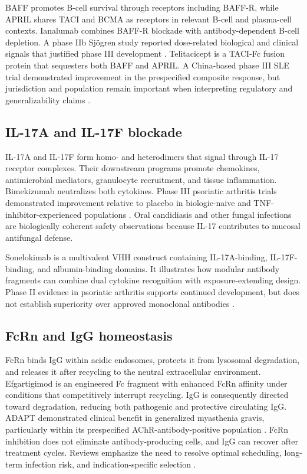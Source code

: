 \documentclass[12pt,a4paper]{article}
\begin{document}
BAFF promotes B-cell survival through receptors including BAFF-R, while APRIL shares TACI and BCMA as receptors in relevant B-cell and plasma-cell contexts. Ianalumab combines BAFF-R blockade with antibody-dependent B-cell depletion. A phase IIb Sjögren study reported dose-related biological and clinical signals that justified phase III development \cite{bowman2022}. Telitacicept is a TACI-Fc fusion protein that sequesters both BAFF and APRIL. A China-based phase III SLE trial demonstrated improvement in the prespecified composite response, but jurisdiction and population remain important when interpreting regulatory and generalizability claims \cite{vollenhoven2025}.

\subsection{IL-17A and IL-17F blockade}
IL-17A and IL-17F form homo- and heterodimers that signal through IL-17 receptor complexes. Their downstream programs promote chemokines, antimicrobial mediators, granulocyte recruitment, and tissue inflammation. Bimekizumab neutralizes both cytokines. Phase III psoriatic arthritis trials demonstrated improvement relative to placebo in biologic-naive and TNF-inhibitor-experienced populations \cite{mcinnes2023,merola2023}. Oral candidiasis and other fungal infections are biologically coherent safety observations because IL-17 contributes to mucosal antifungal defense.

Sonelokimab is a multivalent VHH construct containing IL-17A-binding, IL-17F-binding, and albumin-binding domains. It illustrates how modular antibody fragments can combine dual cytokine recognition with exposure-extending design. Phase II evidence in psoriatic arthritis supports continued development, but does not establish superiority over approved monoclonal antibodies \cite{mcinnes2025}.

\subsection{FcRn and IgG homeostasis}
FcRn binds IgG within acidic endosomes, protects it from lysosomal degradation, and releases it after recycling to the neutral extracellular environment. Efgartigimod is an engineered Fc fragment with enhanced FcRn affinity under conditions that competitively interrupt recycling. IgG is consequently directed toward degradation, reducing both pathogenic and protective circulating IgG. ADAPT demonstrated clinical benefit in generalized myasthenia gravis, particularly within its prespecified AChR-antibody-positive population \cite{howard2021}. FcRn inhibition does not eliminate antibody-producing cells, and IgG can recover after treatment cycles. Reviews emphasize the need to resolve optimal scheduling, long-term infection risk, and indication-specific selection \cite{patel2024fcrn,mohamed2024fcrn}.
\end{document}

